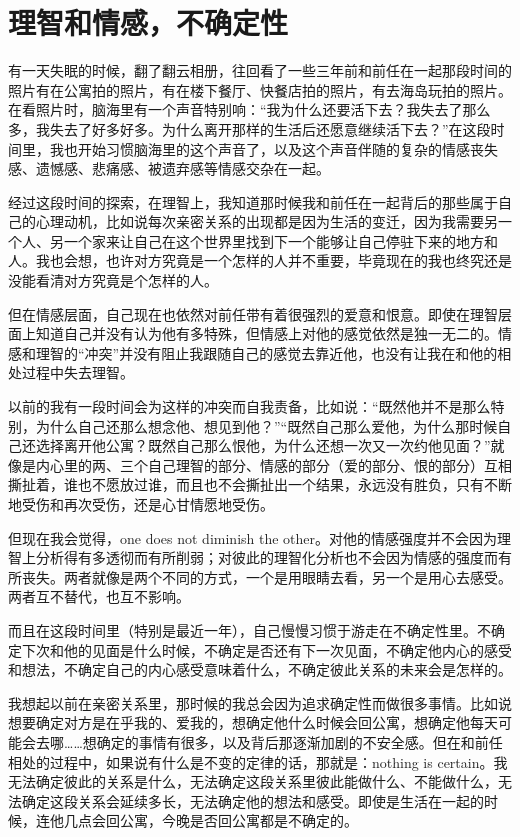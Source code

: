 \chapter{理智和情感，不确定性}




有一天失眠的时候，翻了翻云相册，往回看了一些三年前和前任在一起那段时间的照片\pozhehao{}有在公寓拍的照片，有在楼下餐厅、快餐店拍的照片，有去海岛玩拍的照片。在看照片时，脑海里有一个声音特别响：“我为什么还要活下去？我失去了那么多，我失去了好多好多。为什么离开那样的生活后还愿意继续活下去？”在这段时间里，我也开始习惯脑海里的这个声音了，以及这个声音伴随的复杂的情感\pozhehao{}丧失感、遗憾感、悲痛感、被遗弃感等情感交杂在一起。

经过这段时间的探索，在理智上，我知道那时候我和前任在一起背后的那些属于自己的心理动机，比如说每次亲密关系的出现都是因为生活的变迁，因为我需要另一个人、另一个家来让自己在这个世界里找到下一个能够让自己停驻下来的地方和人。我也会想，也许对方究竟是一个怎样的人并不重要，毕竟现在的我也终究还是没能看清对方究竟是个怎样的人。

但在情感层面，自己现在也依然对前任带有着很强烈的爱意和恨意。即使在理智层面上知道自己并没有认为他有多特殊，但情感上对他的感觉依然是独一无二的。情感和理智的“冲突”并没有阻止我跟随自己的感觉去靠近他，也没有让我在和他的相处过程中失去理智。

以前的我有一段时间会为这样的冲突而自我责备，比如说：“既然他并不是那么特别，为什么自己还那么想念他、想见到他？”“既然自己那么爱他，为什么那时候自己还选择离开他公寓？既然自己那么恨他，为什么还想一次又一次约他见面？”就像是内心里的两、三个自己\pozhehao{}理智的部分、情感的部分（爱的部分、恨的部分）\pozhehao{}互相撕扯着，谁也不愿放过谁，而且也不会撕扯出一个结果，永远没有胜负，只有不断地受伤和再次受伤，还是心甘情愿地受伤。

但现在我会觉得，one does not diminish the other。对他的情感强度并不会因为理智上分析得有多透彻而有所削弱；对彼此的理智化分析也不会因为情感的强度而有所丧失。两者就像是两个不同的方式，一个是用眼睛去看，另一个是用心去感受。两者互不替代，也互不影响。

而且在这段时间里（特别是最近一年），自己慢慢习惯于游走在不确定性里。不确定下次和他的见面是什么时候，不确定是否还有下一次见面，不确定他内心的感受和想法，不确定自己的内心感受意味着什么，不确定彼此关系的未来会是怎样的。

我想起以前在亲密关系里，那时候的我总会因为追求确定性而做很多事情。比如说想要确定对方是在乎我的、爱我的，想确定他什么时候会回公寓，想确定他每天可能会去哪……想确定的事情有很多，以及背后那逐渐加剧的不安全感。但在和前任相处的过程中，如果说有什么是不变的定律的话，那就是：nothing is certain。我无法确定彼此的关系是什么，无法确定这段关系里彼此能做什么、不能做什么，无法确定这段关系会延续多长，无法确定他的想法和感受。即使是生活在一起的时候，连他几点会回公寓，今晚是否回公寓都是不确定的。

